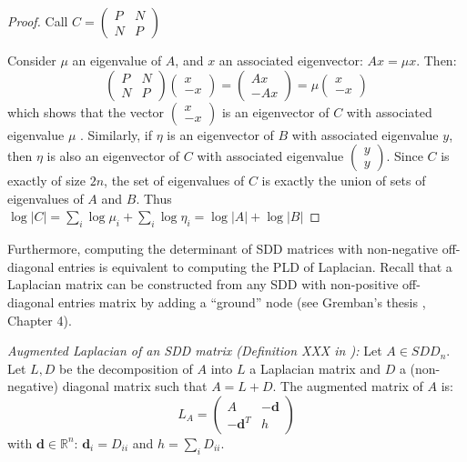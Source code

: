 \begin{proof} Call $C=\left(\begin{array}{cc}
P & N\\
N & P
\end{array}\right)$

Consider $\mu$ an eigenvalue of $A$, and $x$ an associated eigenvector:
$Ax=\mu x$. Then:
\[
\left(\begin{array}{cc}
P & N\\
N & P
\end{array}\right)\left(\begin{array}{c}
x\\
-x
\end{array}\right)=\left(\begin{array}{c}
Ax\\
-Ax
\end{array}\right)=\mu\left(\begin{array}{c}
x\\
-x
\end{array}\right)
\]
which shows that the vector $\left(\begin{array}{c}
x\\
-x
\end{array}\right)$ is an eigenvector of $C$ with associated eigenvalue $\mu$ . Similarly,
if $\eta$ is an eigenvector of $B$ with associated eigenvalue $y$,
then $\eta$ is also an eigenvector of $C$ with associated eigenvalue
$\left(\begin{array}{c}
y\\
y
\end{array}\right)$. Since $C$ is exactly of size $2n$, the set of eigenvalues of $C$
is exactly the union of sets of eigenvalues of $A$ and $B$. Thus
$\log\left|C\right|=\sum_{i}\log\mu_{i}+\sum_{i}\log\eta_{i}=\log\left|A\right|+\log\left|B\right|$

\end{proof}

Furthermore, computing the determinant of SDD matrices with non-negative
off-diagonal entries is equivalent to computing the PLD of Laplacian.
Recall that a Laplacian matrix can be constructed from any SDD with
non-positive off-diagonal entries matrix by adding a ``ground''
node (see Gremban's thesis \cite{Gremban1996}, Chapter 4).

\begin{definition} \emph{Augmented Laplacian of an SDD matrix (Definition
XXX in \cite{Gremban1996}):} Let $A\in SDD_{n}$. Let $L,D$ be the
decomposition of $A$ into $L$ a Laplacian matrix and $D$ a (non-negative)
diagonal matrix such that $A=L+D$. The augmented matrix of $A$ is:
\[
L_{A}=\left(\begin{array}{cc}
A & -\mathbf{d}\\
-\mathbf{d}^{T} & h
\end{array}\right)
\]
with $\mathbf{d}\in\mathbb{R}^{n}$: $\mathbf{d}_{i}=D_{ii}$ and
$h=\sum_{i}D_{ii}$. \end{definition}

